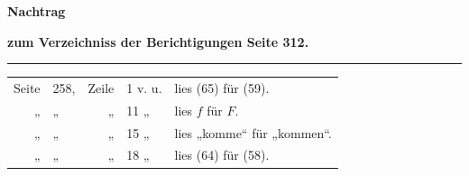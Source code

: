 \documentclass[11pt,a4paper,leqno]{article}
\begin{document}
\begin{center}
{\Large\bfseries Nachtrag}

{\large\bfseries zum Verzeichniss der Berichtigungen Seite 312.}

\rule{1.8cm}{0.4pt}
\end{center}

\begin{tabular}{@{}r@{\ }l@{\ }r@{\ }l@{\ }l@{}}
Seite & 258, & Zeile & 1 v. u. & lies (65) für (59).\\
„     & „    & „     & 11 „     & lies $f$ für $F$.\\
„     & „    & „     & 15 „     & lies „komme“ für „kommen“.\\
„     & „    & „     & 18 „     & lies (64) für (58).\\
\end{tabular}
\end{document}
